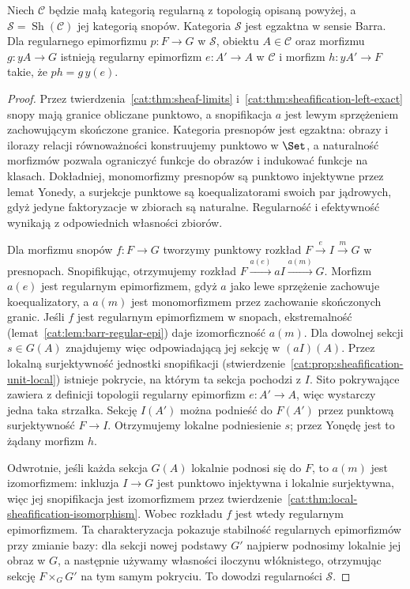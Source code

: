 \begin{lemat}\label{cat:lem:barr-sheaf-exact}
Niech $\mathcal C$ będzie małą kategorią regularną z topologią opisaną powyżej, a $\mathcal S=\operatorname{Sh}(\mathcal C)$ jej kategorią snopów. Kategoria $\mathcal S$ jest egzaktna w sensie Barra. Dla regularnego epimorfizmu $p:F\to G$ w $\mathcal S$, obiektu $A\in\mathcal C$ oraz morfizmu $g:yA\to G$ istnieją regularny epimorfizm $e:A'\to A$ w $\mathcal C$ i morfizm $h:yA'\to F$ takie, że $ph=g\,y(e)$.
\end{lemat}
\begin{proof}
Przez twierdzenia~\ref{cat:thm:sheaf-limits} i~\ref{cat:thm:sheafification-left-exact} snopy mają granice obliczane punktowo, a snopifikacja $a$ jest lewym sprzężeniem zachowującym skończone granice. Kategoria presnopów jest egzaktna: obrazy i ilorazy relacji równoważności konstruujemy punktowo w $\Set$, a naturalność morfizmów pozwala ograniczyć funkcje do obrazów i indukować funkcje na klasach. Dokładniej, monomorfizmy presnopów są punktowo injektywne przez lemat Yonedy, a surjekcje punktowe są koequalizatorami swoich par jądrowych, gdyż jedyne faktoryzacje w zbiorach są naturalne. Regularność i efektywność wynikają z odpowiednich własności zbiorów.

Dla morfizmu snopów $f:F\to G$ tworzymy punktowy rozkład $F\xrightarrow{e}I\xrightarrow{m}G$ w presnopach. Snopifikując, otrzymujemy rozkład $F\xrightarrow{a(e)}aI\xrightarrow{a(m)}G$. Morfizm $a(e)$ jest regularnym epimorfizmem, gdyż $a$ jako lewe sprzężenie zachowuje koequalizatory, a $a(m)$ jest monomorfizmem przez zachowanie skończonych granic. Jeśli $f$ jest regularnym epimorfizmem w snopach, ekstremalność (lemat~\ref{cat:lem:barr-regular-epi}) daje izomorficzność $a(m)$. Dla dowolnej sekcji $s\in G(A)$ znajdujemy więc odpowiadającą jej sekcję w $(aI)(A)$. Przez lokalną surjektywność jednostki snopifikacji (stwierdzenie~\ref{cat:prop:sheafification-unit-local}) istnieje pokrycie, na którym ta sekcja pochodzi z $I$. Sito pokrywające zawiera z definicji topologii regularny epimorfizm $e:A'\to A$, więc wystarczy jedna taka strzałka. Sekcję $I(A')$ można podnieść do $F(A')$ przez punktową surjektywność $F\to I$. Otrzymujemy lokalne podniesienie $s$; przez Yonędę jest to żądany morfizm $h$.

Odwrotnie, jeśli każda sekcja $G(A)$ lokalnie podnosi się do $F$, to $a(m)$ jest izomorfizmem: inkluzja $I\to G$ jest punktowo injektywna i lokalnie surjektywna, więc jej snopifikacja jest izomorfizmem przez twierdzenie~\ref{cat:thm:local-sheafification-isomorphism}. Wobec rozkładu $f$ jest wtedy regularnym epimorfizmem. Ta charakteryzacja pokazuje stabilność regularnych epimorfizmów przy zmianie bazy: dla sekcji nowej podstawy $G'$ najpierw podnosimy lokalnie jej obraz w $G$, a następnie używamy własności iloczynu włóknistego, otrzymując sekcję $F\times_G G'$ na tym samym pokryciu. To dowodzi regularności $\mathcal S$.


\end{proof}
